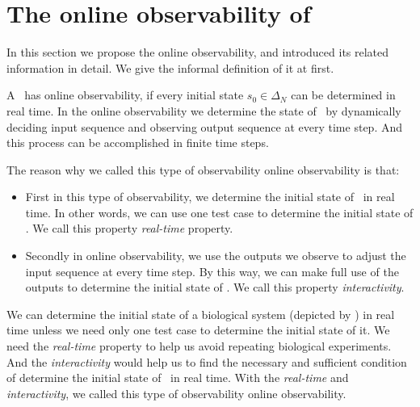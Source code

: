 \section{The online observability of \BCNs}
\label{sec:online}
In this section we propose the online observability, and introduced its related information in detail. We give the informal definition of it at first. 

	A \BCN\ has online observability, if every initial state $s_0 \in \Delta_N$ can be determined in real time. In the online observability we determine the state of \BCN\ by dynamically deciding input sequence and observing output sequence at every time step. And this process can be accomplished in finite time steps.

The reason why we called this type of observability online observability is that:
\begin{itemize}
  \item First in this type of observability, we determine the initial state of \BCNs\ in real time. In other words, we can use one test case to determine the initial state of \BCNs. We call this property {\em real-time} property.%
  \item  Secondly in online observability, we use the outputs we observe to adjust the input sequence at every time step. By this way, we can make full use of the outputs to determine the initial state of \BCNs. We call this property {\em interactivity}.
\end{itemize} 

We can determine the initial state of a biological system (depicted by \BCN) in real time unless we need only one test case to determine the initial state of it. We need the {\em real-time} property to help us avoid repeating biological experiments. And the {\em interactivity} would help us to find the necessary and sufficient condition of determine the initial state of \BCNs\ in real time. With the  {\em real-time} and {\em interactivity}, we called this type of observability online observability.

